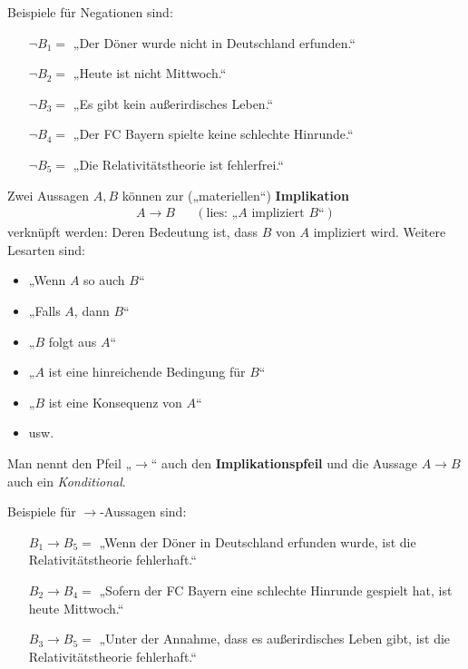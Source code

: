 \begin{bsp}    
    Beispiele für Negationen sind:
    \begin{itemize}[labelindent=1.5em, leftmargin=!, labelwidth=]
        \item[$\neg B_1 =$] „Der Döner wurde nicht in Deutschland erfunden.“
        \item[$\neg B_2 =$] „Heute ist nicht Mittwoch.“
        \item[$\neg B_3 =$] „Es gibt kein außerirdisches Leben.“
        \item[$\neg B_4 =$] „Der FC Bayern spielte keine schlechte Hinrunde.“
        \item[$\neg B_5 =$] „Die Relativitätstheorie ist fehlerfrei.“
    \end{itemize}
\end{bsp}


\begin{de}[Implikationspfeil] 
    Zwei Aussagen $A,B$ können zur („materiellen“) \textbf{Implikation}
    \begin{align*}
        A\to B   && (\text{lies: „$A$ impliziert $B$“})
    \end{align*}
    verknüpft werden: Deren Bedeutung ist, dass $B$ von $A$ impliziert wird. Weitere Lesarten sind:
    \begin{itemize}
        \item „Wenn $A$ so auch $B$“
        \item „Falls $A$, dann $B$“
        \item „$B$ folgt aus $A$“
        \item „$A$ ist eine hinreichende Bedingung für $B$“
        \item „$B$ ist eine Konsequenz von $A$“
        \item usw.
    \end{itemize}
    Man nennt den Pfeil „$\to$“ auch den \textbf{Implikationspfeil} und die Aussage $A\to B$ auch ein \emph{Konditional}.
\end{de}


\begin{bsp}
    Beispiele für $\to$-Aussagen sind:
    \begin{itemize}[labelindent=1.5em, leftmargin=!, labelwidth=]
        \item[$B_1\to B_5=$] „Wenn der Döner in Deutschland erfunden wurde, ist die Relativitätstheorie fehlerhaft.“
        \item[$B_2\to B_4=$] „Sofern der FC Bayern eine schlechte Hinrunde gespielt hat, ist heute Mittwoch.“
        \item[$B_3\to B_5=$] „Unter der Annahme, dass es außerirdisches Leben gibt, ist die Relativitätstheorie fehlerhaft.“
    \end{itemize}
\end{bsp}


